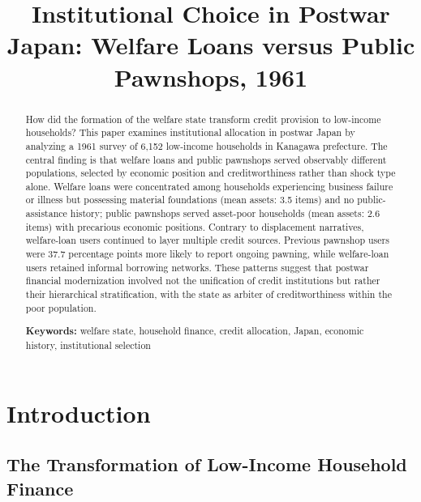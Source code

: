 \documentclass[12pt]{article}
\title{Institutional Choice in Postwar Japan: Welfare Loans versus Public Pawnshops, 1961}
\author{}
\date{}
\begin{document}
\maketitle

\begin{abstract}
How did the formation of the welfare state transform credit provision to low-income households? This paper examines institutional allocation in postwar Japan by analyzing a 1961 survey of 6,152 low-income households in Kanagawa prefecture. The central finding is that welfare loans and public pawnshops served observably different populations, selected by economic position and creditworthiness rather than shock type alone. Welfare loans were concentrated among households experiencing business failure or illness but possessing material foundations (mean assets: 3.5 items) and no public-assistance history; public pawnshops served asset-poor households (mean assets: 2.6 items) with precarious economic positions. Contrary to displacement narratives, welfare-loan users continued to layer multiple credit sources. Previous pawnshop users were 37.7 percentage points more likely to report ongoing pawning, while welfare-loan users retained informal borrowing networks. These patterns suggest that postwar financial modernization involved not the unification of credit institutions but rather their hierarchical stratification, with the state as arbiter of creditworthiness within the poor population.

\vspace{0.5cm}
\noindent \textbf{Keywords:} welfare state, household finance, credit allocation, Japan, economic history, institutional selection
\end{abstract}

\newpage
\section{Introduction}

\subsection{The Transformation of Low-Income Household Finance}
\end{document}
